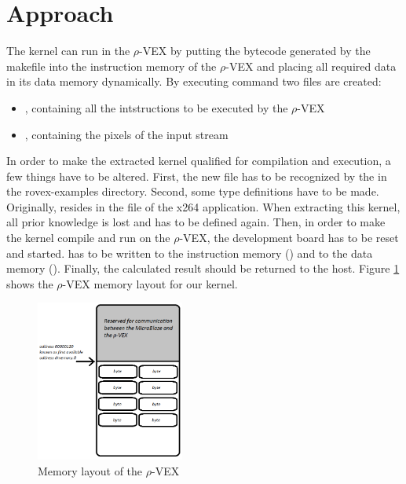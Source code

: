 \section{Approach}
\label{sec:approach}
The kernel can run in the $\rho$-VEX by putting the bytecode generated by the makefile into the instruction memory of the $\rho$-VEX and placing all required data in its data memory dynamically. By executing  command two files are created:
\begin{itemize}
	\item {}, containing all the intstructions to be executed by the $\rho$-VEX
	\item {}, containing the pixels of the input stream
\end{itemize}

In order to make the extracted kernel qualified for compilation and execution, a few things have to be altered. First, the new file has to be recognized by the  in the rovex-examples directory. Second, some type definitions have to be made. Originally,  resides in the  file of the x264 application. When extracting this kernel, all prior knowledge is lost and has to be defined again. Then, in order to make the kernel compile and run on the $\rho$-VEX, the development board has to be reset and started.  has to be written to the instruction memory () and  to the data memory (). Finally, the calculated result should be returned to the host. Figure \ref{fig:rvex-dmem} shows the $\rho$-VEX memory layout for our kernel.
\begin{figure}[htb]%
\centering
\includegraphics[height=200px]{Pictures/dmem_rvex}%
\caption{Memory layout of the $\rho$-VEX}%
\label{fig:rvex-dmem}%
\end{figure}

